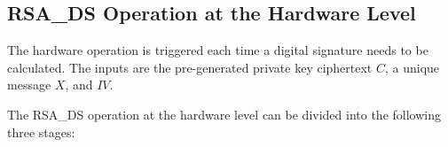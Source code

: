 \documentclass[main\_\_EN.tex]{subfiles}
\begin{document}
\subsection{RSA\_DS Operation at the Hardware Level}
\label{sec:digsig-hardware-level-operation}

The hardware operation is triggered each time a digital signature needs to be calculated. The inputs are the pre-generated private key ciphertext \begin{math}C\end{math}, a unique message \begin{math}X\end{math}, and \begin{math}IV\end{math}.

The RSA\_DS operation at the hardware level can be divided into the following three stages:
\end{document}
